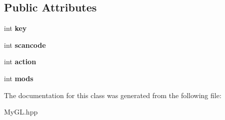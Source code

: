 \subsection*{Public Attributes}
\begin{DoxyCompactItemize}
\item 
\hypertarget{classKey_a49ddb6c986197664f6939db5dfd9c244}{}int {\bfseries key}\label{classKey_a49ddb6c986197664f6939db5dfd9c244}

\item 
\hypertarget{classKey_a13cb660e3e0d92129eeeaa56c5cc8296}{}int {\bfseries scancode}\label{classKey_a13cb660e3e0d92129eeeaa56c5cc8296}

\item 
\hypertarget{classKey_add8acc14210865bd9959bf38ee4e82f8}{}int {\bfseries action}\label{classKey_add8acc14210865bd9959bf38ee4e82f8}

\item 
\hypertarget{classKey_a0e3f757c5b28ee99c9bf6f07811e6637}{}int {\bfseries mods}\label{classKey_a0e3f757c5b28ee99c9bf6f07811e6637}

\end{DoxyCompactItemize}


The documentation for this class was generated from the following file\+:\begin{DoxyCompactItemize}
\item 
My\+G\+L.\+hpp\end{DoxyCompactItemize}
